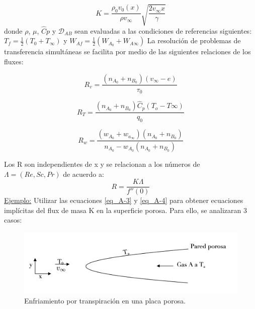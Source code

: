 \begin{equation}
    K=\frac{\rho_0 v_0 (x)}{\rho v_\infty}\sqrt{\frac{2v_\infty x}{\gamma}}
    \tag{A-2}
    \label{eq_A-2}
\end{equation}
donde $\rho$, $\mu$, $\hat{C}p$ y $\mathscr{D}_{AB}$ sean evaluadas a las condiciones de referencias siguientes: $T_f=\frac{1}{2}(T_0+T_\infty)$ y $W_{Af}=\frac{1}{2}(W_{A_0}+W_{A\infty})$
\newline
La resolución de problemas de transferencia simultáneas se facilita por medio de las siguientes relaciones de los fluxes:

\begin{equation*}
   R_v=\frac{(n_{A_0}+n_{B_0})(v_\infty-e)}{\tau_0} 
\end{equation*}

\begin{equation}
R_T=\frac{(n_{A_0}+n_{B_0})\hat{C}_p(T_o-T\infty)}{q_0} \tag{A-3} \label{eq_A-3}
\end{equation}

\begin{equation*}
R_w=\frac{(w_{A_0}+w_{a_\infty})(n_{A_0}+n_{B_0})}{n_{A_0}-w_{A_0}(n_{A_0}+n_{B_0})}
\end{equation*}

Los R son independientes de x y se relacionan a los números de $\Lambda=(Re,Sc,Pr)$ de acuerdo a:
\begin{equation*}
R=\frac{K\Lambda}{f''(0)} \tag{A-4} \label{eq_A-4}
\end{equation*}
\underline{Ejemplo:} Utilizar las ecuaciones \eqref{eq_A-3} y \eqref{eq_A-4} para obtener ecuaciones implícitas del flux de masa K en la superficie porosa. Para ello, se analizaran 3 casos:

\begin{figure}[h]

        \includegraphics[width=\linewidth]{Capitulo3/Imagenes/Fig_A.1.png}
    \caption{Enfriamiento por transpiración en una placa porosa.}
        \label{fig:Fig_A.1}

\end{figure}

